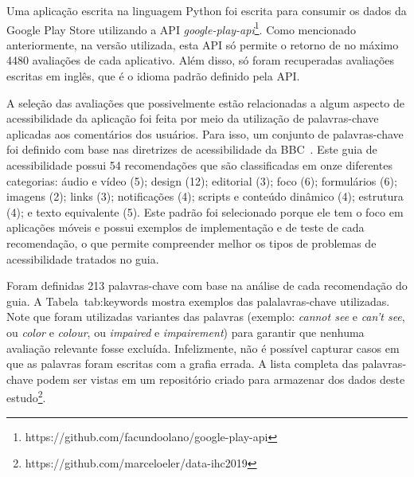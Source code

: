 Uma aplicação escrita na linguagem Python foi escrita para consumir os dados da Google Play Store utilizando a API \emph{google-play-api}\footnote{https://github.com/facundoolano/google-play-api}. Como mencionado anteriormente, na versão utilizada, esta API só permite o retorno de no máximo 4480 avaliações de cada aplicativo. Além disso, só foram recuperadas avaliações escritas em inglês, que é o idioma padrão definido pela API.


A seleção das avaliações que possivelmente estão relacionadas a algum aspecto de acessibilidade da aplicação foi feita por meio da utilização de palavras-chave aplicadas aos comentários dos usuários. 
Para isso, um conjunto de palavras-chave foi definido com base nas diretrizes de acessibilidade da BBC~\cite{bbc}. Este guia de acessibilidade possui 54 recomendações que são classificadas em onze diferentes categorias: áudio e vídeo (5); design (12); editorial (3); foco (6); formulários (6); imagens (2); links (3); notificações (4); scripts e conteúdo dinâmico (4); estrutura (4); e texto equivalente (5). 
Este padrão foi selecionado porque ele tem o foco em aplicações móveis e possui exemplos de implementação e de teste de cada recomendação, o que permite compreender melhor os tipos de problemas de acessibilidade tratados no guia. 

Foram definidas 213 palavras-chave com base na análise de cada recomendação do guia. 
A Tabela~{tab:keywords} mostra exemplos das palalavras-chave utilizadas.
Note que foram utilizadas variantes das palavras (exemplo: \textit{cannot see} e \textit{can't see}, ou \textit{color} e \textit{colour}, ou \textit{impaired} e \textit{impairement}) para garantir que nenhuma avaliação relevante fosse excluída. Infelizmente, não é possível capturar casos em que as palavras foram escritas com a grafia errada. A lista completa das palavras-chave podem ser vistas em um repositório criado para armazenar dos dados deste estudo\footnote{https://github.com/marceloeler/data-ihc2019}.


